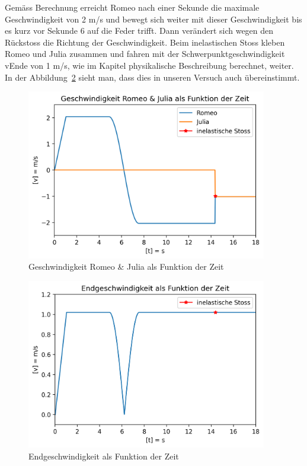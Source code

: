 \documentclass[../main.tex]{subfiles}
\begin{document}
    \noindent    Gemäss Berechnung erreicht Romeo nach einer Sekunde die maximale Geschwindigkeit von 2 m/s und bewegt sich weiter mit dieser Geschwindigkeit bis es kurz vor Sekunde 6 auf die Feder trifft. Dann verändert sich wegen den Rückstoss die Richtung der Geschwindigkeit. Beim inelastischen Stoss kleben Romeo und Julia zusammen und fahren mit der Schwerpunktgeschwindigkeit vEnde von 1 m/s, wie im Kapitel physikalische Beschreibung berechnet, weiter. In der Abbildung~\ref{fig:Endgeschwindigkeit} sieht man, dass dies in unseren Versuch auch übereinstimmt.
    \begin{figure}[H]
        \begin{center}
            \centerline{\includegraphics[width=105mm]{./images/Inelastisch/GeschwindigkeitRomeoJulia}}
            \caption{Geschwindigkeit Romeo \& Julia als Funktion der Zeit}
            \label{fig:GeschwindigkeitRomeoJulia}
        \end{center}
    \end{figure}

    \begin{figure}[H]
        \begin{center}
            \centerline{\includegraphics[width=105mm]{./images/Inelastisch/Endgeschwindigkeit}}
            \caption{Endgeschwindigkeit als Funktion der Zeit}
            \label{fig:Endgeschwindigkeit}
        \end{center}
    \end{figure}
\end{document}
